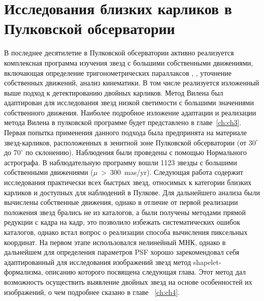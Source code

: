 \section{Исследования близких карликов в Пулковской обсерватории} \label{sec:ch1/sec4}
В последнее десятилетие в Пулковской обсерватории активно реализуется комплексная программа изучения звезд с большими собственными движениями, включающая определение тригонометрических параллаксов  \cite{2010AstL...36..576K}, \cite{2013MNRAS.435.1083K}, уточнение собственных движений, анализ кинематики. В том числе реализуется изложенный выше подход к детектированию двойных карликов. Метод Вилена был адаптирован для исследования звезд низкой светимости с большими значениями собственного движения. Наиболее подробное изложение адаптации и реализации метода Вилена в пулковской программе будет представлено в главе~\ref{ch:ch3}. Первая попытка применения данного подхода \cite{2011AstL...37..420K} была предпринята на материале звезд-карликов, расположенных в зенитной зоне Пулковской обсерватории (от $30^\circ$ до $70^\circ$ по склонению). Наблюдения были проведены с помощью Нормального астрографа. В наблюдательную программу вошли 1123 звезды с большими собственными движениями ($\mu$~>~300~mas/yr). Следующая работа \cite{2015AstL...41..833K} содержит исследования практически всех быстрых звезд, относимых к категории близких карликов и доступных для наблюдений в Пулкове. Для дальнейшего анализа были вычислены собственные движения, однако в отличие от первой реализации положения звезд брались не из каталогов, а были получены методами прямой редукции с кадра на кадр, это позволило избежать систематических ошибок каталогов, однако встал вопрос о реализации способа вычисления пиксельных координат. На первом этапе использовался нелинейный МНК, однако в дальнейшем для определения параметров PSF хорошо зарекомендовал себя адаптированный для исследования изображений звезд метод shapelet-формализма, описанию которого посвящена следующая глава. Этот метод дал возможность осуществить выявление двойных звезд на основе особенностей их изображений, о чем подробнее сказано в главе ~\ref{ch:ch4}.